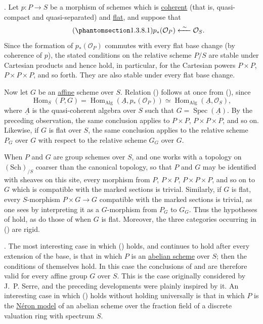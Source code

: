 
. Let $p:P\longrightarrow S$ be a morphism of schemes which is
\underline{coherent} (that is, quasi-compact and quasi-separated) and
\underline{flat}, and suppose that
\begin{equation}\tag{\SGARefTarget{sga7.sga7i.evii.n1-3-8-1}{1.3.8.1}}
 p_*(\mathcal O_P)\xleftarrow{\ \sim\ }\mathcal O_S.
\end{equation}
Since the formation of $p_*(\mathcal O_P)$ commutes with every flat base
change (by coherence of $p$), the stated conditions on the relative
scheme $P/S$ are stable under Cartesian products and hence hold, in
particular, for the Cartesian powers $P\times P$,
$P\times P\times P$, and so forth. They are also stable under every flat
base change.

Now let $G$ be an \underline{affine} scheme over $S$. Relation
() follows at once from (), since
\[
 \operatorname{Hom}_S(P,G)
 =\operatorname{Hom}_{\mathrm{Alg}}(\underline A,p_*(\mathcal O_P))
 \simeq\operatorname{Hom}_{\mathrm{Alg}}(\underline A,\mathcal O_S),
\]
where $\underline A$ is the quasi-coherent algebra over $S$ such that
$G=\operatorname{Spec}(\underline A)$. By the preceding observation,
the same conclusion applies to $P\times P$, $P\times P\times P$, and
so on. Likewise, if $G$ is flat over $S$, the same conclusion applies
to the relative scheme $P_G$ over $G$ with respect to the relative
scheme $G_G$ over $G$.

When $P$ and $G$ are group schemes over $S$, and one works with a
topology on $(\mathrm{Sch})_{/S}$ coarser than the canonical topology,
so that $P$ and $G$ may be identified with sheaves on this site, every
morphism from $P$, $P\times P$, $P\times P\times P$, and so on to $G$
which is compatible with the marked sections is trivial. Similarly, if
$G$ is flat, every $S$-morphism $P\times G\longrightarrow G$ compatible
with the marked sections is trivial, as one sees by interpreting it as
a $G$-morphism from $P_G$ to $G_G$. Thus the hypotheses of  hold,
as do those of  when $G$ is flat. Moreover, the three categories
occurring in () are rigid.


. The most interesting case in which () holds, and
continues to hold after every extension of the base, is that in which
$P$ is an \underline{abelian scheme} over $S$; then the conditions of
 themselves hold. In this case the conclusions of  and 
are therefore valid for every affine group $G$ over $S$. This is the
case originally considered by J.~P. Serre, and the preceding
developments were plainly inspired by it. An interesting case in which
() holds without holding universally is that in which $P$ is the
\underline{N\'eron model} of an abelian scheme over the fraction field
of a discrete valuation ring with spectrum $S$.

